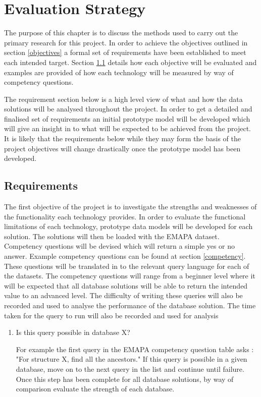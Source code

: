 \chapter{Evaluation Strategy}
The purpose of this chapter is to discuss the methods used to carry out the primary research for this project. In order to achieve the objectives outlined in section \ref{objectives} a formal set of requirements have been established to meet each intended target. Section \ref{requirements} details how each objective will be evaluated and examples are provided of how each technology will be measured by way of competency questions.

The requirement section below is a high level view of what and how the data solutions will be analysed throughout the project. In order to get a detailed and finalised set of requirements an initial prototype model will be developed which will give an insight in to what will be expected to be achieved from the project. It is likely that the requirements below while they may form the basis of the project objectives will change drastically once the prototype model has been developed.

\section{Requirements}\label{requirements}

The first objective of the project is to investigate the strengths and weaknesses of the functionality each technology provides. In order to evaluate the functional limitations of each technology, prototype data models will be developed for each solution. The solutions will then be loaded with the EMAPA dataset. Competency questions will be devised which will return a simple yes or no answer. Example competency questions can be found at section \ref{competency}. These questions will be translated in to the relevant query language for each of the datasets. The competency questions will range from a beginner level where it will be expected that all database solutions will be able to return the intended value to an advanced level. The difficulty of writing these queries will also be recorded and used to analyse the performance of the database solution. The time taken for the query to run will also be recorded and used for analysis

\begin{enumerate}
\item Is this query possible in database X?

For example the first query in the EMAPA competency question table asks : "For structure X, find all the ancestors." If this query is possible in a given database, move on to the next query in the list and continue until failure. Once this step has been complete for all database solutions, by way of comparison evaluate the strength of each database.
\end{enumerate}

